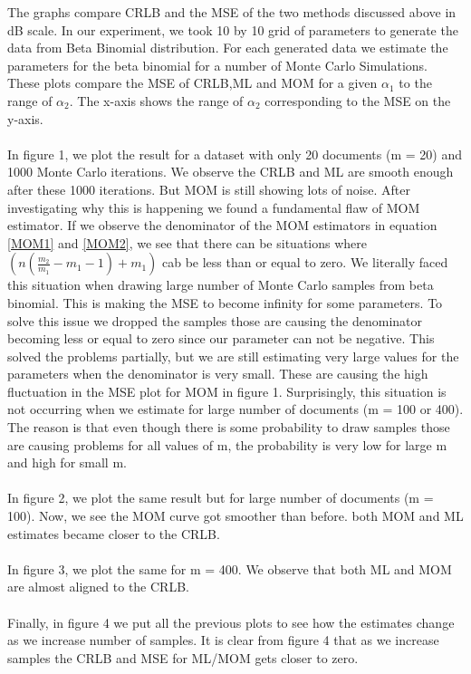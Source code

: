 \documentclass{article} %
\newcommand{\?}{\stackrel{?}{=}}
\begin{document}
The graphs compare CRLB and the MSE of the two methods discussed above in dB scale. In our experiment, we took 10 by 10 grid of parameters to generate the data from Beta Binomial distribution. For each generated data we estimate the parameters for the beta binomial for a number of Monte Carlo Simulations. These plots compare the MSE of CRLB,ML and MOM for a given $\alpha_1$  to the range of $\alpha_2$. The x-axis shows the range of $\alpha_2$ corresponding to the MSE on the y-axis.\\
\\
In figure 1, we plot the result for a dataset with only 20 documents (m = 20) and 1000 Monte Carlo iterations. We observe the CRLB and ML are smooth enough after these 1000 iterations. But MOM is still showing lots of noise. After investigating why this is happening we found a fundamental flaw of MOM estimator. If we observe the denominator of the MOM estimators in equation \ref{MOM1} and \ref{MOM2}, we see that there can be situations where \mbox{$(n(\frac{m_2}{m_1}-m_1-1)+m_1)$} cab be less than or equal to zero. We literally faced this situation when drawing large number of Monte Carlo samples from beta binomial. This is making the MSE to become infinity for some parameters. To solve this issue we dropped the samples those are causing the denominator becoming less or equal to zero since our parameter can not be negative. This solved the problems partially, but we are still estimating very large values for the parameters when the denominator is very small. These are causing the high fluctuation in the MSE plot for MOM in figure 1. Surprisingly, this situation is not occurring when we estimate for large number of documents (m = 100 or 400). The reason is that even though there is some probability to draw samples those are causing problems for all values of m, the probability is very low for large m and high for small m.\\
\\
In figure 2, we plot the same result but for large number of documents (m = 100). Now, we see the MOM curve got smoother than before. both MOM and ML estimates became closer to the CRLB.\\
\\
In figure 3, we plot the same for m = 400. We observe that both ML and MOM are almost aligned to the CRLB.\\
\\
Finally, in figure 4 we put all the previous plots to see how the estimates change as we increase number of samples. It is clear from figure 4 that as we increase samples the CRLB and MSE for ML/MOM gets closer to zero.
 
\end{document}
